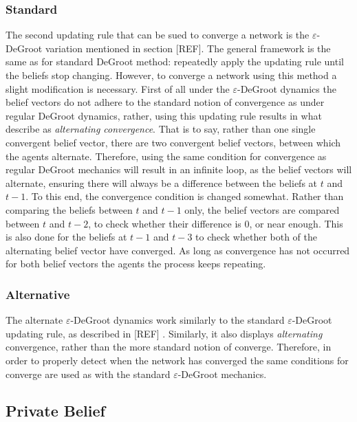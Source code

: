 \documentclass{article}
\begin{document}
\subsubsection{Standard}

The second updating rule that can be sued to converge a network is the $\varepsilon$-DeGroot variation mentioned in section [REF]. The general framework is the same as for standard DeGroot method: repeatedly apply the updating rule until the beliefs stop changing. However, to converge a network using this method a slight modification is necessary. First of all under the $\varepsilon$-DeGroot dynamics the belief vectors do not adhere to the standard notion of convergence as under regular DeGroot dynamics, rather, using this updating rule results in what \cite{amir2021robust} describe as \textit{alternating convergence}. That is to say, rather than one single convergent belief vector, there are two convergent belief vectors, between which the agents alternate.
Therefore, using the same condition for convergence as regular DeGroot mechanics will result in an infinite loop, as the belief vectors will alternate, ensuring there will always be a difference between the beliefs at $t$ and $t-1$. To this end, the convergence condition is changed somewhat. Rather than comparing the beliefs between $t$ and $t-1$ only, the belief vectors are compared between $t$ and $t-2$, to check whether their difference is 0, or near enough. This is also done for the beliefs at $t-1$ and $t-3$ to check whether both of the alternating belief vector have converged. As long as convergence has not occurred for both belief vectors the agents the process keeps repeating.

\subsubsection{Alternative}

The alternate $\varepsilon$-DeGroot dynamics work similarly to the standard $\varepsilon$-DeGroot updating rule, as described in [REF] . Similarly, it also displays \textit{alternating} convergence, rather than the more standard notion of converge. Therefore, in order to properly detect when the network has converged the same conditions for converge are used as with the standard $\varepsilon$-DeGroot mechanics.

\subsection{Private Belief}
\end{document}
